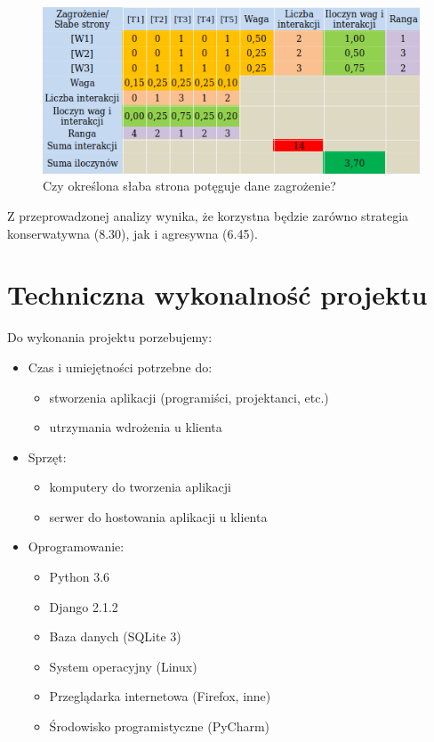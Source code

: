 \documentclass[12pt]{article}
\begin{document}
\begin{figure}[H]
	\centering
	\includegraphics[scale=1.1]{img/swot5.png}
	\caption{Czy określona słaba strona potęguje dane zagrożenie?}
\end{figure}

Z przeprowadzonej analizy wynika, że korzystna będzie zarówno strategia konserwatywna (8.30), jak i agresywna (6.45).
\newpage
\section{Techniczna wykonalność projektu}
Do wykonania projektu porzebujemy:
\begin{itemize}
	\item Czas i umiejętności potrzebne do:
	\begin{itemize}
		\item stworzenia aplikacji (programiści, projektanci, etc.)
		\item utrzymania wdrożenia u klienta
	\end{itemize}
	\item Sprzęt:
	\begin{itemize}
		\item komputery do tworzenia aplikacji
		\item serwer do hostowania aplikacji u klienta
	\end{itemize}
	\item Oprogramowanie:
	\begin{itemize}
		\item Python 3.6
		\item Django 2.1.2
		\item Baza danych (SQLite 3)
		\item System operacyjny (Linux)
		\item Przeglądarka internetowa (Firefox, inne)
		\item Środowisko programistyczne (PyCharm)
		
	\end{itemize}
\end{itemize}
\end{document}
